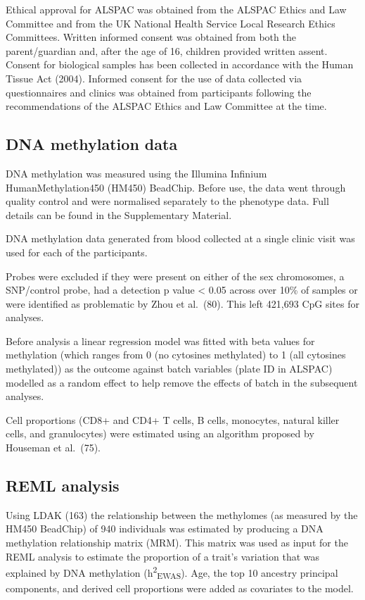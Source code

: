 \documentclass[11pt,oneside]{bristolthesis}
\begin{document}
Ethical approval for ALSPAC was obtained from the ALSPAC Ethics and Law Committee and from the UK National Health Service Local Research Ethics Committees. Written informed consent was obtained from both the parent/guardian and, after the age of 16, children provided written assent. Consent for biological samples has been collected in accordance with the Human Tissue Act (2004). Informed consent for the use of data collected via questionnaires and clinics was obtained from participants following the recommendations of the ALSPAC Ethics and Law Committee at the time.

\hypertarget{dna-methylation-data-05}{%
\subsection{DNA methylation data}\label{dna-methylation-data-05}}

DNA methylation was measured using the Illumina Infinium HumanMethylation450 (HM450) BeadChip. Before use, the data went through quality control and were normalised separately to the phenotype data. Full details can be found in the Supplementary Material.

DNA methylation data generated from blood collected at a single clinic visit was used for each of the participants.

Probes were excluded if they were present on either of the sex chromosomes, a SNP/control probe, had a detection p value \textless{} 0.05 across over 10\% of samples or were identified as problematic by Zhou et al.~(80). This left 421,693 CpG sites for analyses.

Before analysis a linear regression model was fitted with beta values for methylation (which ranges from 0 (no cytosines methylated) to 1 (all cytosines methylated)) as the outcome against batch variables (plate ID in ALSPAC) modelled as a random effect to help remove the effects of batch in the subsequent analyses.

Cell proportions (CD8+ and CD4+ T cells, B cells, monocytes, natural killer cells, and granulocytes) were estimated using an algorithm proposed by Houseman et al.~(75).

\hypertarget{reml-analysis}{%
\subsection{REML analysis}\label{reml-analysis}}

Using LDAK (163) the relationship between the methylomes (as measured by the HM450 BeadChip) of 940 individuals was estimated by producing a DNA methylation relationship matrix (MRM). This matrix was used as input for the REML analysis to estimate the proportion of a trait's variation that was explained by DNA methylation (h\textsuperscript{2}\textsubscript{EWAS}). Age, the top 10 ancestry principal components, and derived cell proportions were added as covariates to the model.
\end{document}
